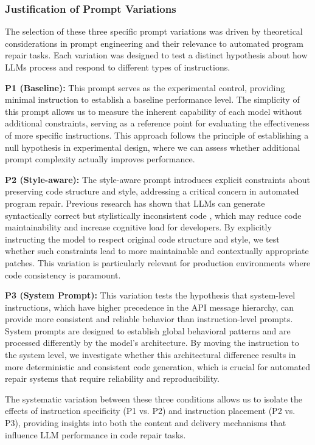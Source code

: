 \subsubsection{Justification of Prompt Variations}
The selection of these three specific prompt variations was driven by theoretical considerations in prompt engineering and their relevance to automated program repair tasks. Each variation was designed to test a distinct hypothesis about how LLMs process and respond to different types of instructions.

\textbf{P1 (Baseline):} This prompt serves as the experimental control, providing minimal instruction to establish a baseline performance level. The simplicity of this prompt allows us to measure the inherent capability of each model without additional constraints, serving as a reference point for evaluating the effectiveness of more specific instructions. This approach follows the principle of establishing a null hypothesis in experimental design, where we can assess whether additional prompt complexity actually improves performance.

\textbf{P2 (Style-aware):} The style-aware prompt introduces explicit constraints about preserving code structure and style, addressing a critical concern in automated program repair. Previous research has shown that LLMs can generate syntactically correct but stylistically inconsistent code \cite{wang2025functionalcorrectnessinvestigatingcoding}, which may reduce code maintainability and increase cognitive load for developers. By explicitly instructing the model to respect original code structure and style, we test whether such constraints lead to more maintainable and contextually appropriate patches. This variation is particularly relevant for production environments where code consistency is paramount.

\textbf{P3 (System Prompt):} This variation tests the hypothesis that system-level instructions, which have higher precedence in the API message hierarchy, can provide more consistent and reliable behavior than instruction-level prompts. System prompts are designed to establish global behavioral patterns and are processed differently by the model's architecture. By moving the instruction to the system level, we investigate whether this architectural difference results in more deterministic and consistent code generation, which is crucial for automated repair systems that require reliability and reproducibility.

The systematic variation between these three conditions allows us to isolate the effects of instruction specificity (P1 vs. P2) and instruction placement (P2 vs. P3), providing insights into both the content and delivery mechanisms that influence LLM performance in code repair tasks.

